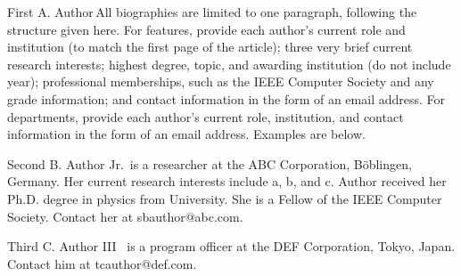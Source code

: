 \documentclass{IEEEcsmag}
\begin{document}
\def\refname{REFERENCES}


  



\begin{IEEEbiography}{First A. Author}{\,}All biographies are limited to one paragraph, following the structure given here. For features, provide each author's current role and institution (to match the first page of the article); three very brief current research interests; highest degree, topic, and awarding institution (do not include year); professional memberships, such as the IEEE Computer Society and any grade information; and contact information in the form of an email address. For departments, provide each author's current role, institution, and contact information in the form of an email address. Examples are below. \vadjust{\vfill\pagebreak}
\end{IEEEbiography}

\begin{IEEEbiography}{Second B. Author Jr.}{\,} is a researcher at the  ABC Corporation, B\"oblingen, Germany.  Her current research interests include a, b, and c. Author received her Ph.D. degree  in physics from University. She is a Fellow of the IEEE Computer Society. Contact her at sbauthor@abc.com.\vspace*{8pt}
\end{IEEEbiography}

\begin{IEEEbiography}{Third C. Author III} {\,} is a program officer at the  DEF Corporation, Tokyo, Japan. Contact him at tcauthor@def.com.
\end{IEEEbiography}
\end{document}
